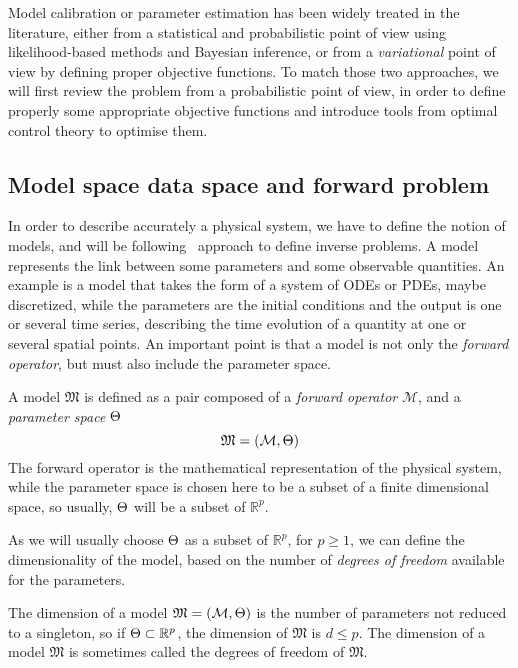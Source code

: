 \documentclass[../../Main_ManuscritThese.tex]{subfiles}
\begin{document}
Model calibration or parameter estimation has been widely treated in
the literature, either from a statistical and probabilistic point of
view using likelihood-based methods and Bayesian inference, or from a
\emph{variational} point of view by defining proper objective
functions. To match those two approaches, we will first review the
problem from a probabilistic point of view, in order to define
properly some appropriate objective functions and introduce tools from
optimal control theory to optimise them.

 \subsection{Model space data space and forward problem}
\label{sec:model_space_data_space}
In order to describe accurately a physical system, we have to define
the notion of models, and will be
following~\cite{tarantola_inverse_2005} approach to define inverse
problems.  A model represents the link between some parameters and
some observable quantities. An example is a model that takes the form
of a system of ODEs or PDEs, maybe discretized, while the parameters
are the initial conditions and the output is one or several time
series, describing the time evolution of a quantity at one or several
spatial points. An important point is that a model is not only the
\emph{forward operator}, but must also include the parameter space.


 \begin{definition}[Model]
   \label{def:model}
  A model $\mathfrak{M}$ is defined as a pair composed of a \emph{forward operator} $\mathcal{M}$, and a \emph{parameter space} $\Theta$
  \begin{equation}
    \mathfrak{M} = (\mathcal{M}, \Theta)
  \end{equation}
  The forward operator is the mathematical representation of the
  physical system, while the parameter space is chosen here to be a
  subset of a finite dimensional space, so usually, $\Theta$ will be a
  subset of $\mathbb{R}^p$.
\end{definition}
As we will usually choose $\Theta$ as a subset of $\mathbb{R}^p$, for
$p\geq 1$, we can define the dimensionality of the model, based on the
number of \emph{degrees of freedom} available for the parameters.


\begin{remark}
  \label{rmk:model_dimension}
  The dimension of a model $\mathfrak{M}=(\mathcal{M},\Theta)$ is the number of parameters not reduced to a singleton, so if $\Theta \subset \mathbb{R}^p$, the dimension of $\mathfrak{M}$ is $d \leq p$. The dimension of a model $\mathfrak{M}$ is sometimes called the degrees of freedom of $\mathfrak{M}$.
  \end{remark}
\end{document}

